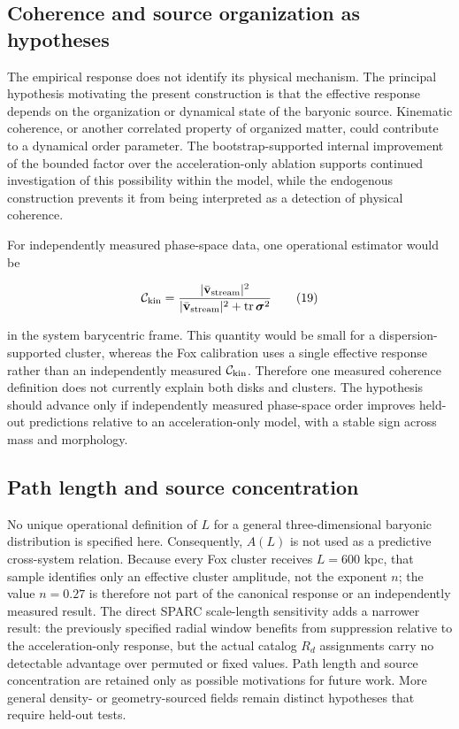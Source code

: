 \documentclass[utf8]{FrontiersinHarvard}
\begin{document}
\subsection{Coherence and source organization as hypotheses}\label{coherence-and-source-organization-as-hypotheses}

The empirical response does not identify its physical mechanism. The principal hypothesis motivating the present construction is that the effective response depends on the organization or dynamical state of the baryonic source. Kinematic coherence, or another correlated property of organized matter, could contribute to a dynamical order parameter. The bootstrap-supported internal improvement of the bounded factor over the acceleration-only ablation supports continued investigation of this possibility within the model, while the endogenous construction prevents it from being interpreted as a detection of physical coherence.

For independently measured phase-space data, one operational estimator would be

\[
\mathcal C_{\rm kin}=
\frac{|\bar{\mathbf v}_{\rm stream}|^2}
{|\bar{\mathbf v}_{\rm stream}|^2+
{\rm tr}\,\boldsymbol{\sigma}^2}
\tag{19}
\]

in the system barycentric frame. This quantity would be small for a dispersion-supported cluster, whereas the Fox calibration uses a single effective response rather than an independently measured \(\mathcal C_{\rm kin}\). Therefore one measured coherence definition does not currently explain both disks and clusters. The hypothesis should advance only if independently measured phase-space order improves held-out predictions relative to an acceleration-only model, with a stable sign across mass and morphology.

\subsection{Path length and source concentration}\label{path-length-and-source-concentration}

No unique operational definition of \(L\) for a general three-dimensional baryonic distribution is specified here. Consequently, \(A(L)\) is not used as a predictive cross-system relation. Because every Fox cluster receives \(L=600\) kpc, that sample identifies only an effective cluster amplitude, not the exponent \(n\); the value \(n=0.27\) is therefore not part of the canonical response or an independently measured result. The direct SPARC scale-length sensitivity adds a narrower result: the previously specified radial window benefits from suppression relative to the acceleration-only response, but the actual catalog \(R_d\) assignments carry no detectable advantage over permuted or fixed values. Path length and source concentration are retained only as possible motivations for future work. More general density- or geometry-sourced fields remain distinct hypotheses that require held-out tests.
\end{document}
